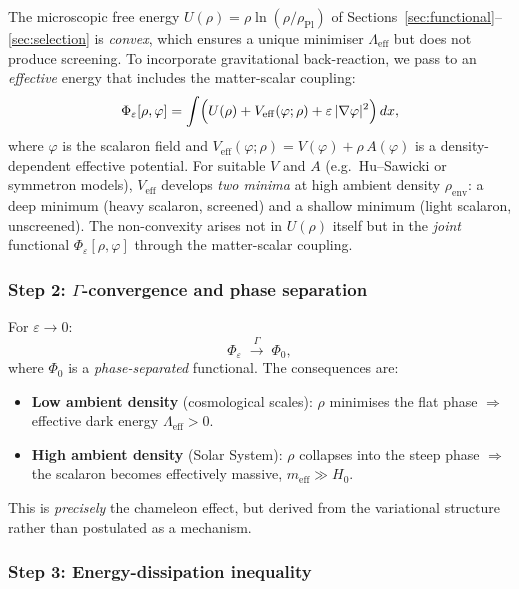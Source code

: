 \documentclass[12pt,a4paper]{article}
\theoremstyle{definition}
\theoremstyle{plain}
\theoremstyle{remark}
\begin{document}
The microscopic free energy $U(\rho) = \rho\ln(\rho/\rho_{\mathrm{Pl}})$ of Sections~\ref{sec:functional}--\ref{sec:selection} is \emph{convex}, which ensures a unique minimiser $\Lambda_{\mathrm{eff}}$ but does not produce screening. To incorporate gravitational back-reaction, we pass to an \emph{effective} energy that includes the matter-scalar coupling:
\begin{equation}\label{eq:phi-eps-screening}
  \Phi_\varepsilon[\rho, \varphi] = \int \Bigl( U(\rho) + V_{\mathrm{eff}}(\varphi;\rho) + \varepsilon\,|\nabla\varphi|^2 \Bigr)\,dx,
\end{equation}
where $\varphi$ is the scalaron field and $V_{\mathrm{eff}}(\varphi;\rho) = V(\varphi) + \rho\,A(\varphi)$ is a density-dependent effective potential. For suitable $V$ and $A$ (e.g.\ Hu--Sawicki \cite{HuSawicki2007} or symmetron models), $V_{\mathrm{eff}}$ develops \emph{two minima} at high ambient density $\rho_{\mathrm{env}}$: a deep minimum (heavy scalaron, screened) and a shallow minimum (light scalaron, unscreened). The non-convexity arises not in $U(\rho)$ itself but in the \emph{joint} functional $\Phi_\varepsilon[\rho,\varphi]$ through the matter-scalar coupling.

\subsubsection*{Step 2: $\Gamma$-convergence and phase separation}

For $\varepsilon \to 0$:
\[
  \Phi_\varepsilon \;\xrightarrow{\;\Gamma\;}\; \Phi_0,
\]
where $\Phi_0$ is a \emph{phase-separated} functional. The consequences are:
\begin{itemize}
\item \textbf{Low ambient density} (cosmological scales): $\rho$ minimises the flat phase $\Rightarrow$ effective dark energy $\Lambda_{\mathrm{eff}} > 0$.
\item \textbf{High ambient density} (Solar System): $\rho$ collapses into the steep phase $\Rightarrow$ the scalaron becomes effectively massive, $m_{\mathrm{eff}} \gg H_0$.
\end{itemize}
This is \emph{precisely} the chameleon effect, but derived from the variational structure rather than postulated as a mechanism.

\subsubsection*{Step 3: Energy-dissipation inequality}
\end{document}
